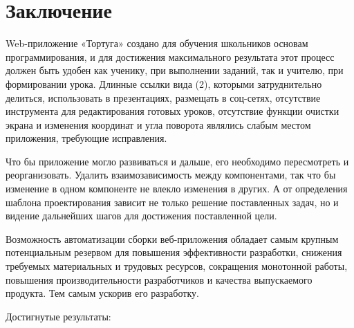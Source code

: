 \chapter*{Заключение}						%

Web-приложение «Тортуга» создано для обучения школьников основам программирования, и для достижения максимального результата этот процесс должен быть удобен как ученику, при выполнении заданий, так и учителю, при формировании урока. Длинные ссылки вида (2), которыми затруднительно делиться, использовать в презентациях, размещать в соц-сетях, отсутствие инструмента для редактирования готовых уроков, отсутствие функции очистки экрана и изменения координат и угла поворота являлись слабым местом приложения, требующие исправления.\par

Что бы приложение могло развиваться и дальше, его необходимо пересмотреть и реорганизовать. Удалить взаимозависимость между компонентами, так что бы изменение в одном компоненте не влекло изменения в других. А от определения шаблона проектирования зависит не только решение поставленных задач, но и видение дальнейших шагов для достижения поставленной цели.\par

Возможность  автоматизации сборки веб-приложения обладает самым крупным потенциальным резервом для повышения эффективности разработки, снижения требуемых материальных и трудовых ресурсов, сокращения монотонной работы, повышения производительности разработчиков и качества выпускаемого продукта. Тем самым ускорив его разработку.\par
\vspace{16mm}
Достигнутые результаты:

